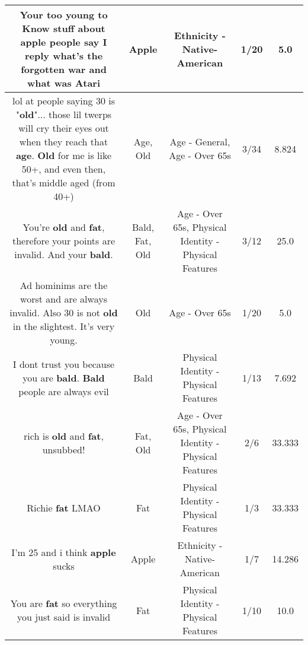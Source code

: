 \documentclass[11pt]{article}
\newlength\mylength
\begin{document}
\begin{center}
\begin{longtable}{|C{.65\mylength}|C{.30\mylength}|C{.12\mylength}|C{.12\mylength}|C{.12\mylength}|}
  \small Your too young to Know stuff about \textbf{apple} people say I reply what's the forgotten war and what was Atari\normalsize   & Apple & Ethnicity - Native-American & 1/20 & 5.0 \\  \hline
  \small lol at people saying 30 is "\textbf{old}"... those lil twerps will cry their eyes out when they reach that \textbf{age}. \textbf{Old} for me is like 50+, and even then, that's middle aged (from 40+)\normalsize   & Age, Old & Age - General, Age - Over 65s & 3/34 & 8.824 \\  \hline
  \small You're \textbf{old} and \textbf{fat}, therefore your points are invalid. And your \textbf{bald}.\normalsize   & Bald, Fat, Old & Age - Over 65s, Physical Identity - Physical Features & 3/12 & 25.0 \\  \hline
  \small Ad hominims are the worst and are always invalid.  Also 30 is not \textbf{old} in the slightest.  It's very young.\normalsize   & Old & Age - Over 65s & 1/20 & 5.0 \\  \hline
  \small I dont trust you because you are \textbf{bald}. \textbf{Bald} people are always evil\normalsize   & Bald & Physical Identity - Physical Features & 1/13 & 7.692 \\  \hline
  \small rich is \textbf{old} and \textbf{fat}, unsubbed!\normalsize   & Fat, Old & Age - Over 65s, Physical Identity - Physical Features & 2/6 & 33.333 \\  \hline
  \small Richie \textbf{fat} LMAO\normalsize   & Fat & Physical Identity - Physical Features & 1/3 & 33.333 \\  \hline
  \small I'm 25 and i think \textbf{apple} sucks\normalsize   & Apple & Ethnicity - Native-American & 1/7 & 14.286 \\  \hline
  \small You are \textbf{fat} so everything you just said is invalid\normalsize   & Fat & Physical Identity - Physical Features & 1/10 & 10.0 \\  \hline

\end{longtable}
\end{center}
\end{document}
